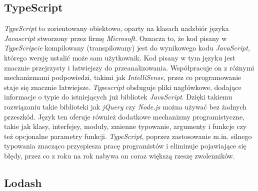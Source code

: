 \subsection{TypeScript}
\textit{TypeScript} to zorientowany obiektowo, oparty na klasach nadzbiór języka \textit{Javascript} stworzony przez firmę \textit{Microsoft}. Oznacza to, że kod pisany w \textit{TypeScripcie} kompilowany (transpilowany) jest do wynikowego kodu \textit{JavaScript}, którego wersję ustalić może sam użytkownik. Kod pisany w tym języku jest znacznie przejrzysty i łatwiejszy do przeanalizowania. Współpracuje on z różnymi mechanizmami podpowiedzi, takimi jak \textit{IntelliSense}, przez co programowanie staje się znacznie łatwiejsze. \textit{Typescript} obsługuje pliki nagłówkowe, dodające informacje o typie do istniejących już bibliotek \textit{JavaScript}. Dzięki takiemu rozwiązaniu takie biblioteki jak \textit{jQuery} czy \textit{Node.js} można używać bez żadnych przeszkód. Język ten oferuje również dodatkowe mechanizmy programistyczne, takie jak klasy, interfejsy, moduły, zmienne typowanie, argumenty i funkcje czy też opcjonalne parametry funkcji. \textit{TypeScript}, poprzez zastosowanie m.in. silnego typowania znacząco przyspiesza pracę programistów i eliminuje pojawiające się błędy, przez co z roku na rok nabywa on coraz większą rzeszę zwolenników. \cite{TypeScript}

\subsection{Lodash}

